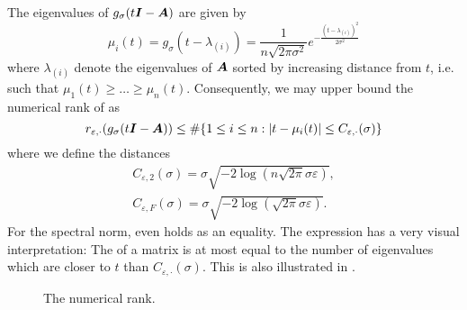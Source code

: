 The eigenvalues of $g_{\sigma}(t\boldsymbol{I} - \boldsymbol{A})$ are given by
\begin{equation}
    \mu_i(t) = g_{\sigma}(t - \lambda_{(i)}) = \frac{1}{n \sqrt{2 \pi \sigma^2}} e^{-\frac{(t - \lambda_{(i)})^2}{2 \sigma^2}}
    \label{equ:3-nystrom-kernel-function-eigenvalues}
\end{equation}
where $\lambda_{(i)}$ denote the eigenvalues of $\boldsymbol{A}$ sorted by increasing
distance from $t$, i.e. such that $\mu_1(t) \geq \dots \geq \mu_n(t)$. Consequently,
we may upper bound the numerical rank of  as
\begin{equation}
    r_{\varepsilon, \cdot}(g_{\sigma}(t\boldsymbol{I} - \boldsymbol{A})) \leq \#\{1\leq i\leq n: |t - \mu_i(t)| \leq C_{\varepsilon, \cdot}(\sigma)\}
    \label{equ:3-nystrom-kernel-numerical-rank}
\end{equation}
where we define the distances
\begin{align}
    C_{\varepsilon, 2}(\sigma) = \sigma \sqrt{-2 \log(n \sqrt{2 \pi} \sigma \varepsilon)}, \label{equ:3-nystrom-kernel-numerical-rank-spectral-constant} \\
    C_{\varepsilon, F}(\sigma) = \sigma \sqrt{-2 \log(\sqrt{2 \pi} \sigma \varepsilon)}. \label{equ:3-nystrom-kernel-numerical-rank-frobenius-constant} 
\end{align}
For the spectral norm,  even holds
as an equality.
The expression  has a very
visual interpretation: The  of a matrix is at most
equal to the number of eigenvalues which are closer to $t$ than $C_{\varepsilon, \cdot}(\sigma)$.
This is also illustrated in .\\
\begin{figure}
    \centering
    \caption{The numerical rank.}
    \label{fig:3-nystrom-numerical-rank-constant}
\end{figure}

